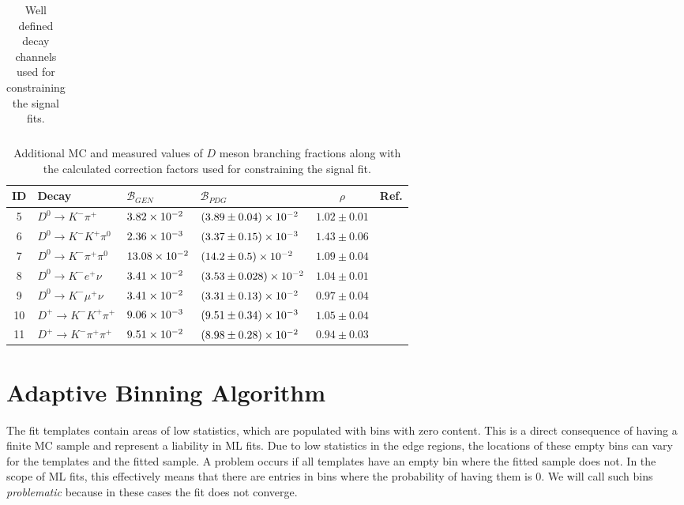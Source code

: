 \begin{table}[H]
\begin{tabular}{l|l|l|l|l}
	\end{tabular}
	\captionsetup{width=0.8\linewidth}
	\caption{Well defined decay channels used for constraining the signal fits.}
	\label{tab:sig_constraint_table}
\end{table}

\begin{table}[H]
	\centering
	\begin{tabular}{c|l|l|l|c|c}
		ID & Decay & $\mathcal{B}_{GEN}$ & $\mathcal{B}_{PDG}$ & $\rho$ & Ref. \\ 
		\toprule
		5 &    $D^0 \to K^-\pi^+$ & $3.82\times 10^{-2}$ & $(3.89\pm0.04)\times 10^{-2}$ & $1.02 \pm 0.01$ & \multirow{7}{*}{ \cite{tanabashi2018review}} \\
		6 & $D^0 \to K^-K^+\pi^0$ & $2.36\times 10^{-3}$ & $(3.37\pm0.15)\times 10^{-3}$ & $1.43 \pm 0.06$ & \\
		7 & $D^0 \to K^-\pi^+\pi^0$ & $13.08\times 10^{-2}$ & $(14.2\pm0.5)\times 10^{-2}$ & $1.09 \pm 0.04$ &  \\
		8 & $D^0 \to K^-e^+\nu$ & $3.41\times 10^{-2}$ & $(3.53\pm0.028)\times 10^{-2}$ & $1.04 \pm 0.01$ &  \\
		9 & $D^0 \to K^-\mu^+\nu$ & $3.41\times 10^{-2}$ & $(3.31\pm0.13)\times 10^{-2}$ & $0.97 \pm 0.04$ &  \\
		10 & $D^+ \to K^-K^+\pi^+$ & $9.06\times 10^{-3}$ & $(9.51\pm0.34)\times 10^{-3}$ & $1.05 \pm 0.04$ &  \\
		11 & $D^+ \to K^-\pi^+\pi^+$ & $9.51\times 10^{-2}$ & $(8.98\pm0.28)\times 10^{-2}$ & $0.94 \pm 0.03$ &  \\
		\bottomrule
	\end{tabular}
	\captionsetup{width=0.8\linewidth}
	\caption{Additional MC and measured values of $D$ meson branching fractions along with the calculated correction factors used for constraining the signal fit.}
	\label{tab:sig_br_constraint_table}
\end{table}

\section{Adaptive Binning Algorithm}\label{sec:adaptive-binning-algorithm}

The fit templates contain areas of low statistics, which are populated with bins with zero content. This is a direct consequence of having a finite MC sample and represent a liability in ML fits. Due to low statistics in the edge regions, the locations of these empty bins can vary for the templates and the fitted sample. A problem occurs if all templates have an empty bin where the fitted sample does not. In the scope of ML fits, this effectively means that there are entries in bins where the probability of having them is $0$. We will call such bins \textit{problematic} because in these cases the fit does not converge.

